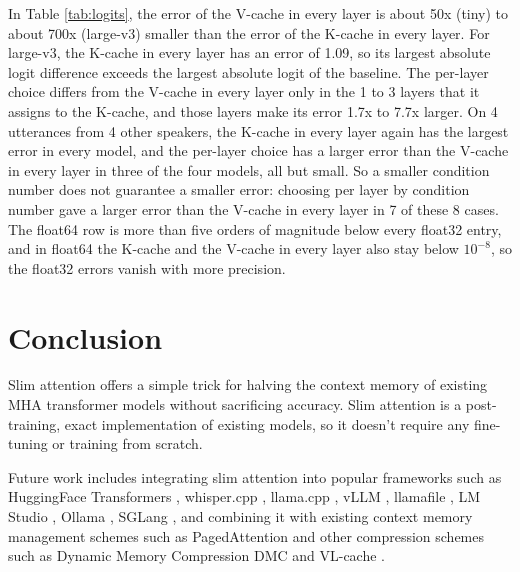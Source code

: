 \documentclass{article}
\begin{document}
In Table \ref{tab:logits}, the error of the V-cache in every layer is about 50x (tiny) to about 700x (large-v3) smaller than the error of the K-cache in every layer. For large-v3, the K-cache in every layer has an error of 1.09, so its largest absolute logit difference exceeds the largest absolute logit of the baseline. The per-layer choice differs from the V-cache in every layer only in the 1 to 3 layers that it assigns to the K-cache, and those layers make its error 1.7x to 7.7x larger. On 4 utterances from 4 other speakers, the K-cache in every layer again has the largest error in every model, and the per-layer choice has a larger error than the V-cache in every layer in three of the four models, all but small. So a smaller condition number does not guarantee a smaller error: choosing per layer by condition number gave a larger error than the V-cache in every layer in 7 of these 8 cases. The float64 row is more than five orders of magnitude below every float32 entry, and in float64 the K-cache and the V-cache in every layer also stay below $10^{-8}$, so the float32 errors vanish with more precision.

\section{Conclusion}
Slim attention offers a simple trick for halving the context memory of existing MHA transformer models without sacrificing accuracy. Slim attention is a post-training, exact implementation of existing models, so it doesn't require any fine-tuning or training from scratch.

Future work includes integrating slim attention into popular frameworks such as HuggingFace Transformers \citep{HFtransformers}, whisper.cpp \citep{whisper-cpp}, llama.cpp \citep{llama-cpp}, vLLM \citep{vLLM}, llamafile \citep{llamafile}, LM Studio \citep{lmstudio}, Ollama \citep{ollama}, SGLang \citep{sglang}, and combining it with existing context memory management schemes such as PagedAttention \citep{pagedAttn} and other compression schemes such as Dynamic Memory Compression DMC \citep{DMC} and VL-cache \citep{VL-cache}.


\end{document}

